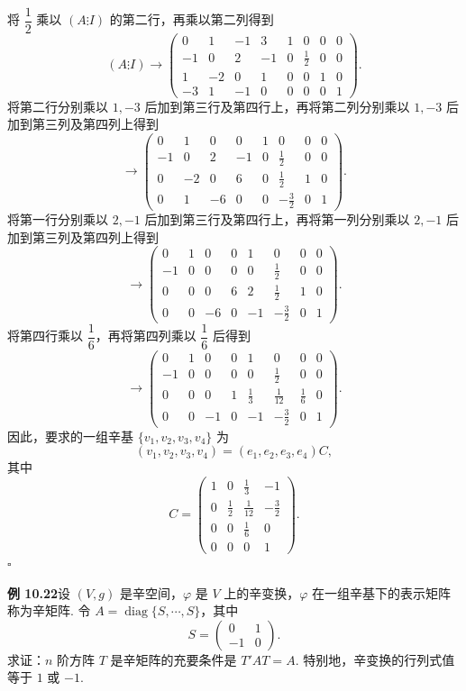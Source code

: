 \documentclass[UTF8,12pt,a4paper,fontset=fandol]{ctexart}
\begin{document}
将 $\dfrac12$ 乘以 $(A\vdots I)$ 的第二行，再乘以第二列得到
\[
(A\vdots I)\longrightarrow
\left(\begin{array}{rrrr|rrrr}
0 & 1 & -1 & 3 & 1 & 0 & 0 & 0\\
-1 & 0 & 2 & -1 & 0 & \frac12 & 0 & 0\\
1 & -2 & 0 & 1 & 0 & 0 & 1 & 0\\
-3 & 1 & -1 & 0 & 0 & 0 & 0 & 1
\end{array}\right).
\]
将第二行分别乘以 $1,-3$ 后加到第三行及第四行上，再将第二列分别乘以 $1,-3$ 后加到第三列及第四列上得到
\[
\longrightarrow
\left(\begin{array}{rrrr|rrrr}
0 & 1 & 0 & 0 & 1 & 0 & 0 & 0\\
-1 & 0 & 2 & -1 & 0 & \frac12 & 0 & 0\\
0 & -2 & 0 & 6 & 0 & \frac12 & 1 & 0\\
0 & 1 & -6 & 0 & 0 & -\frac32 & 0 & 1
\end{array}\right).
\]
将第一行分别乘以 $2,-1$ 后加到第三行及第四行上，再将第一列分别乘以 $2,-1$ 后加到第三列及第四列上得到
\[
\longrightarrow
\left(\begin{array}{rrrr|rrrr}
0 & 1 & 0 & 0 & 1 & 0 & 0 & 0\\
-1 & 0 & 0 & 0 & 0 & \frac12 & 0 & 0\\
0 & 0 & 0 & 6 & 2 & \frac12 & 1 & 0\\
0 & 0 & -6 & 0 & -1 & -\frac32 & 0 & 1
\end{array}\right).
\]
将第四行乘以 $\dfrac16$，再将第四列乘以 $\dfrac16$ 后得到
\[
\longrightarrow
\left(\begin{array}{rrrr|rrrr}
0 & 1 & 0 & 0 & 1 & 0 & 0 & 0\\
-1 & 0 & 0 & 0 & 0 & \frac12 & 0 & 0\\
0 & 0 & 0 & 1 & \frac13 & \frac1{12} & \frac16 & 0\\
0 & 0 & -1 & 0 & -1 & -\frac32 & 0 & 1
\end{array}\right).
\]
因此，要求的一组辛基 $\{v_1,v_2,v_3,v_4\}$ 为
\[
(v_1,v_2,v_3,v_4)=(e_1,e_2,e_3,e_4)C,
\]
其中
\[
C=\left(\begin{array}{rrrr}
1 & 0 & \frac13 & -1\\
0 & \frac12 & \frac1{12} & -\frac32\\
0 & 0 & \frac16 & 0\\
0 & 0 & 0 & 1
\end{array}\right).
\]
$\square$

\noindent\textbf{例 10.22}\quad 设 $(V,g)$ 是辛空间，$\varphi$ 是 $V$ 上的辛变换，$\varphi$ 在一组辛基下的表示矩阵称为辛矩阵. 令 $A=\operatorname{diag}\{S,\cdots,S\}$，其中
\[
S=\left(\begin{array}{cc}
0 & 1\\
-1 & 0
\end{array}\right).
\]
求证：$n$ 阶方阵 $T$ 是辛矩阵的充要条件是 $T'AT=A$. 特别地，辛变换的行列式值等于 $1$ 或 $-1$.
\end{document}
